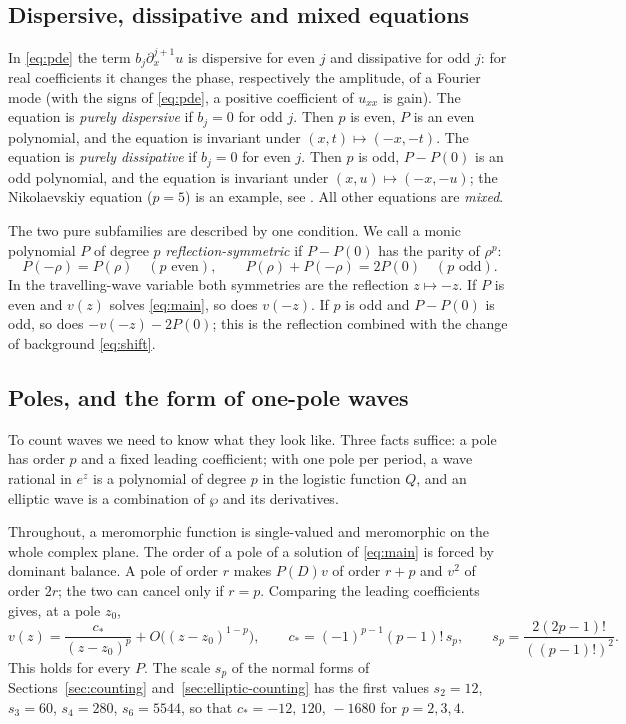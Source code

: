 \subsection{Dispersive, dissipative and mixed equations}

In \eqref{eq:pde} the term \(b_j\partial_x^{j+1}u\) is dispersive for
even \(j\) and dissipative for odd \(j\): for real coefficients it
changes the phase, respectively the amplitude, of a Fourier mode (with
the signs of \eqref{eq:pde}, a positive coefficient of \(u_{xx}\) is
gain). The equation is \emph{purely dispersive} if \(b_j=0\) for odd
\(j\). Then \(p\) is even, \(P\) is an even polynomial, and the equation
is invariant under \((x,t)\mapsto(-x,-t)\). The equation is \emph{purely
dissipative} if \(b_j=0\) for even \(j\). Then \(p\) is odd, \(P-P(0)\)
is an odd polynomial, and the equation is invariant under
\((x,u)\mapsto(-x,-u)\); the Nikolaevskiy equation (\(p=5\)) is an
example, see \citet{SimbawaMatthewsCox2010}. All other equations are
\emph{mixed}.

The two pure subfamilies are described by one condition. We call a monic
polynomial \(P\) of degree \(p\) \emph{reflection-symmetric} if
\(P-P(0)\) has the parity of \(\rho^p\):
\begin{equation}\label{eq:symmetric-class}
 P(-\rho)=P(\rho)\quad(p\text{ even}),\qquad
 P(\rho)+P(-\rho)=2P(0)\quad(p\text{ odd}).
\end{equation}
In the travelling-wave variable both symmetries are the reflection
\(z\mapsto-z\). If \(P\) is even and \(v(z)\) solves \eqref{eq:main}, so
does \(v(-z)\). If \(p\) is odd and \(P-P(0)\) is odd, so does
\(-v(-z)-2P(0)\); this is the reflection combined with the change of
background \eqref{eq:shift}.

\subsection{Poles, and the form of one-pole waves}\label{sec:systems}

To count waves we need to know what they look like. Three facts suffice:
a pole has order \(p\) and a fixed leading coefficient; with one pole
per period, a wave rational in \(e^z\) is a polynomial of degree \(p\)
in the logistic function \(Q\), and an elliptic wave is a combination of
\(\wp\) and its derivatives.

Throughout, a meromorphic function is single-valued and meromorphic on
the whole complex plane. The order of a pole of a solution of
\eqref{eq:main} is forced by dominant balance. A pole of order \(r\)
makes \(P(D)v\) of order \(r+p\) and \(v^2\) of order \(2r\); the two
can cancel only if \(r=p\). Comparing the leading coefficients gives, at
a pole \(z_0\),
\begin{equation}\label{eq:leadingpole}
 v(z)=\frac{c_\ast}{(z-z_0)^{p}}+O\bigl((z-z_0)^{1-p}\bigr),\qquad
 c_\ast=(-1)^{p-1}(p-1)!\,s_p,\qquad s_p=\frac{2(2p-1)!}{((p-1)!)^2}.
\end{equation}
This holds for every \(P\). The scale \(s_p\) of the normal forms of
Sections~\ref{sec:counting} and~\ref{sec:elliptic-counting} has the
first values \(s_2=12\), \(s_3=60\), \(s_4=280\), \(s_6=5544\), so that
\(c_\ast=-12,\,120,\,-1680\) for \(p=2,3,4\).

